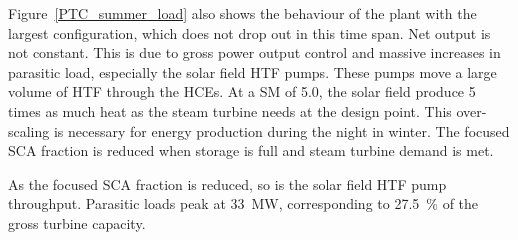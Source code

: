 
Figure~\ref{PTC_summer_load} also shows the behaviour of the plant with the largest configuration, which does not drop out in this time span. Net output is not constant. This is due to gross power output control and massive increases in parasitic load, especially the solar field HTF pumps. These pumps move a large volume of HTF through the HCEs. At a SM of \num{5.0}, the solar field produce \num{5} times as much heat as the steam turbine needs at the design point. This over-scaling is necessary for energy production during the night in winter. The focused SCA fraction is reduced when storage is full and steam turbine demand is met.


As the focused SCA fraction is reduced, so is the solar field HTF pump throughput. Parasitic loads peak at \SI{33}{MW}, corresponding to \SI{27.5}{\percent} of the gross turbine capacity.

